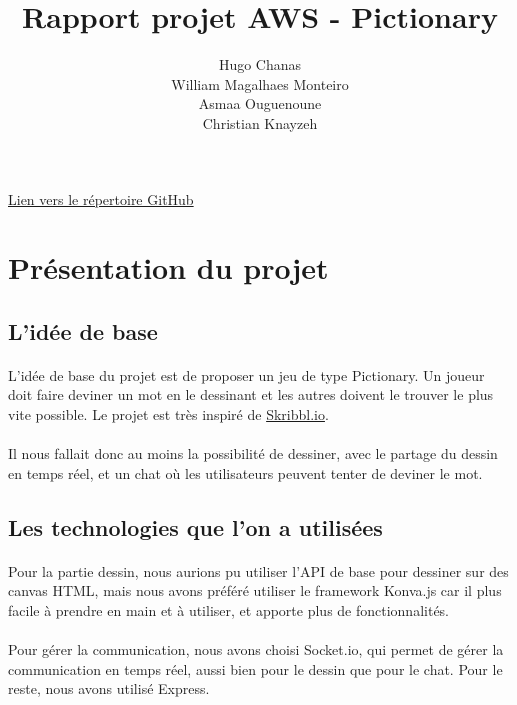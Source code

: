 \documentclass[11pt,a4paper]{article}
\date{}
\title{Rapport projet AWS - Pictionary}
\author{ Hugo Chanas \\ William Magalhaes Monteiro \\ Asmaa Ouguenoune \\ Christian Knayzeh }
\begin{document}
    \maketitle
    \begin{center}
        \href{https://github.com/WilliamMagalhaesMontei/AWS}{Lien vers  le répertoire GitHub}
    \end{center}
    \section{Présentation du projet}
        \subsection{L'idée de base}
            \paragraph{}
            L'idée de base du projet est de proposer un jeu de type Pictionary.
            Un joueur doit faire deviner un mot en le dessinant et les autres doivent le trouver le plus vite possible.
            Le projet est très inspiré de \href{https://skribbl.io/}{Skribbl.io}.
            \paragraph{}
            Il nous fallait donc au moins la possibilité de dessiner, avec le partage du dessin en temps réel,
            et un chat où les utilisateurs peuvent tenter de deviner le mot.
        \subsection{Les technologies que l'on a utilisées}
            \paragraph{}
            Pour la partie dessin, nous aurions pu utiliser l'API de base pour dessiner sur des canvas HTML,
            mais nous avons préféré utiliser le framework Konva.js car il plus facile à prendre en main et à utiliser,
            et apporte plus de fonctionnalités.
            \paragraph{}
            Pour gérer la communication, nous avons choisi Socket.io, qui permet de gérer la communication en temps réel,
            aussi bien pour le dessin que pour le chat. Pour le reste, nous avons utilisé Express.
\end{document}
